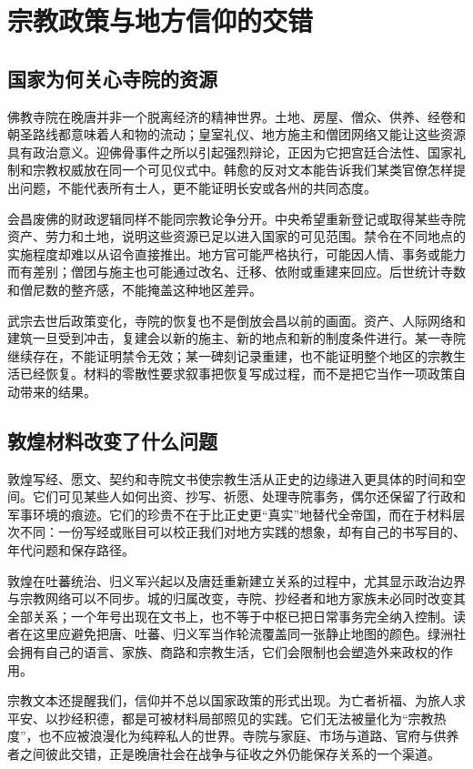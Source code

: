 \section{宗教政策与地方信仰的交错}

\subsection{国家为何关心寺院的资源}
佛教寺院在晚唐并非一个脱离经济的精神世界。土地、房屋、僧众、供养、经卷和朝圣路线都意味着人和物的流动；皇室礼仪、地方施主和僧团网络又能让这些资源具有政治意义。迎佛骨事件之所以引起强烈辩论，正因为它把宫廷合法性、国家礼制和宗教权威放在同一个可见仪式中。韩愈的反对文本能告诉我们某类官僚怎样提出问题，不能代表所有士人，更不能证明长安或各州的共同态度。

会昌废佛的财政逻辑同样不能同宗教论争分开。中央希望重新登记或取得某些寺院资产、劳力和土地，说明这些资源已足以进入国家的可见范围。禁令在不同地点的实施程度却难以从诏令直接推出。地方官可能严格执行，可能因人情、事务或能力而有差别；僧团与施主也可能通过改名、迁移、依附或重建来回应。后世统计寺数和僧尼数的整齐感，不能掩盖这种地区差异。

武宗去世后政策变化，寺院的恢复也不是倒放会昌以前的画面。资产、人际网络和建筑一旦受到冲击，复建会以新的施主、新的地点和新的制度条件进行。某一寺院继续存在，不能证明禁令无效；某一碑刻记录重建，也不能证明整个地区的宗教生活已经恢复。材料的零散性要求叙事把恢复写成过程，而不是把它当作一项政策自动带来的结果。

\subsection{敦煌材料改变了什么问题}
敦煌写经、愿文、契约和寺院文书使宗教生活从正史的边缘进入更具体的时间和空间。它们可见某些人如何出资、抄写、祈愿、处理寺院事务，偶尔还保留了行政和军事环境的痕迹。它们的珍贵不在于比正史更“真实”地替代全帝国，而在于材料层次不同：一份写经或账目可以校正我们对地方实践的想象，却有自己的书写目的、年代问题和保存路径。

敦煌在吐蕃统治、归义军兴起以及唐廷重新建立关系的过程中，尤其显示政治边界与宗教网络可以不同步。城的归属改变，寺院、抄经者和地方家族未必同时改变其全部关系；一个年号出现在文书上，也不等于中枢已把日常事务完全纳入控制。读者在这里应避免把唐、吐蕃、归义军当作轮流覆盖同一张静止地图的颜色。绿洲社会拥有自己的语言、家族、商路和宗教生活，它们会限制也会塑造外来政权的作用。

宗教文本还提醒我们，信仰并不总以国家政策的形式出现。为亡者祈福、为旅人求平安、以抄经积德，都是可被材料局部照见的实践。它们无法被量化为“宗教热度”，也不应被浪漫化为纯粹私人的世界。寺院与家庭、市场与道路、官府与供养者之间彼此交错，正是晚唐社会在战争与征收之外仍能保存关系的一个渠道。

